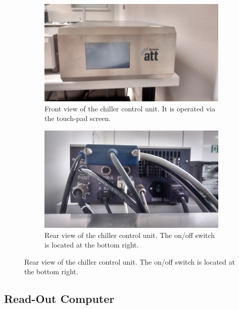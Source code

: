 \documentclass[a4paper]{article}
\begin{document}
\begin{figure}[hbtp]
\centering
\begin{subfigure}[t]{0.475\textwidth}
\centering\captionsetup{width=.8\linewidth}%
\includegraphics[width=\linewidth]{pictures/att_front.jpg}
\caption[Front View of the Chiller Control Unit]{Front view of the chiller control unit. It is operated via the touch-pad screen.}
\label{fig:attfront}
\end{subfigure}
\begin{subfigure}[t]{0.475\textwidth}
\centering\captionsetup{width=.8\linewidth}%
\includegraphics[width=\linewidth]{pictures/att_back.jpg}
\caption[Back View of the Chiller Control Unit]{Rear view of the chiller control unit. The on/off switch is located at the bottom right.}
\label{fig:attback}
\end{subfigure}
\end{figure}

\subsection{Read-Out Computer}
\label{sec:computer}
\end{document}
